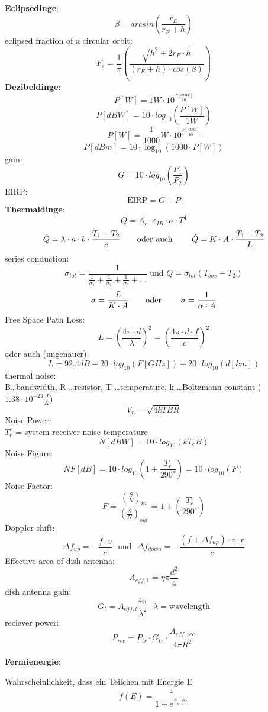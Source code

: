 \documentclass[a4paper,10pt]{article}
\newcommand{\f}{\textbf}
\begin{document}
\f{Eclipsedinge}:
\[\beta = arcsin\left(\frac{r_E}{r_E+h}\right)\]
eclipsed fraction of a circular orbit:
\[F_e = \frac{1}{\pi}\left(\frac{\sqrt{h^2 +2r_E\cdot h}}{(r_E + h)\cdot cos(\beta)} \right)\]
\f{Dezibeldinge}:
\[P[W] = 1W\cdot 10^{\frac{P[dBW]}{10}}\]
\[P[dBW] = 10\cdot log_{10}\left(\frac{P[W]}{1W}\right)\]
\[P[W] = \frac{1}{1000} W \cdot 10^{\frac{P[dBm]}{10}}\]
\[P[dBm] = 10\cdot \log_{10}(1000\cdot P[W])\]
gain:
\[G = 10\cdot log_{10}\left(\frac{P_1}{P_2}\right)\]
EIRP: 
\[\text{EIRP} = G + P\]
\f{Thermaldinge}:
\[Q = A_r\cdot \varepsilon_{IR}\cdot \sigma \cdot T^4\]
\[\dot{Q} = \lambda\cdot a\cdot b \cdot \frac{T_1-T_2}{c} \text{\qquad oder auch \qquad} \dot{Q} = K \cdot A \cdot \frac{T_1-T_2}{L}\]
series conduction:
\[\sigma_{tot} = \frac{1}{\frac{1}{\sigma_1} + \frac{1}{\sigma_2} + \frac{1}{\sigma_3} + \dots} \text{   und   } Q = \sigma_{tot}(T_{box} - T_2) \]
\[\sigma = \frac{L}{K\cdot A} \text{\qquad oder \qquad} \sigma = \frac{1}{\alpha\cdot A}\]
Free Space Path Loss:
\[L = \left(\frac{4\pi\cdot d}{\lambda}\right)^2 = \left(\frac{4\pi\cdot d\cdot f}{c}\right)^2\] 
oder auch (ungenauer)
\[L = 92.4dB + 20\cdot log_{10}(F[GHz]) + 20\cdot log_{10}(d[km])\]
thermal noise:\\
B\dots bandwidth, R \dots resistor, T \dots temperature, k \dots Boltzmann constant ($1.38\cdot 10^{-23}\frac{J}{K}$)
\[V_n = \sqrt{4kTBR}\]
Noise Power:\\
$T_e$ = system receiver noise temperature
\[N[dBW] = 10\cdot log_{10}(kT_eB)\]
Noise Figure:\\
\[NF[dB] = 10\cdot log_{10}\left(1 + \frac{T_e}{290^{\circ}}\right) = 10\cdot log_{10}(F)\]
Noise Factor:
\[F = \frac{\left(\frac{S}{N}\right)_{in}}{\left(\frac{S}{N}\right)_{out}} = 1 + \left(\frac{T_e}{290^{\circ}}\right)\]
Doppler shift:
\[ \Delta f_{up} = -\frac{f\cdot v}{c} ~~~\text{und}~~~ \Delta f_{down} = - \frac{(f+\Delta f_{up}) \cdot v \cdot r}{c}\]
Effective area of dish antenna:
\[ A_{eff,1} = \eta\pi\frac{d_1^2}{4} \]
dish antenna gain:
\[ G_t = A_{eff,t} \frac{4\pi}{\lambda^2} ~~~ \lambda = \text{wavelength}\]
reciever power:
\[ P_{rec} = P_{tr}\cdot G_{tr}\cdot \frac{A_{eff,rec}}{4\pi R^2} \]
\vspace*{5pt}

\noindent %
\f{Fermienergie}:\\
\vspace*{3pt}

\noindent Wahrscheinlichkeit, dass ein Teilchen mit Energie E 
\[f(E) = \frac{1}{1 + e^{\frac{E-E_F}{k\cdot T}}}\]
\vspace*{5pt}
\end{document}
